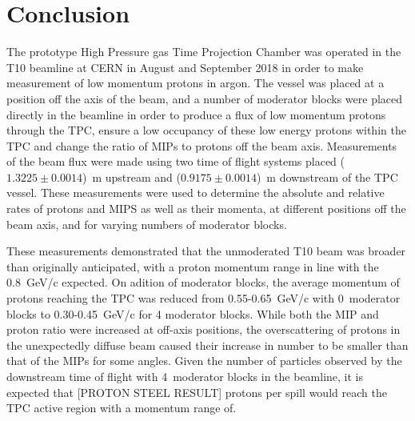 \section{Conclusion}
\label{hptpcPaper:sec:Conclusion}

The prototype High Pressure gas Time Projection Chamber was operated in the T10 beamline at CERN in August and September 2018 in order to make measurement of low momentum protons in argon.
The vessel was placed at a position off the axis of the beam, and a number of moderator blocks were placed directly in the beamline in order to produce a flux of low momentum protons through the TPC, ensure a low occupancy of these low energy protons within the TPC and change the ratio of MIPs to protons off the beam axis.
Measurements of the beam flux were made using two time of flight systems placed ($1.3225 \pm 0.0014$)~m upstream and ($0.9175 \pm 0.0014$)~m downstream of the TPC vessel.
These measurements were used to determine the absolute and relative rates of protons and MIPS as well as their momenta, at different positions off the beam axis, and for varying numbers of moderator blocks.

These measurements demonstrated that the unmoderated T10 beam was broader than originally anticipated, with a proton momentum range in line with the 0.8~GeV/c expected.
On adition of moderator blocks, the average momentum of protons reaching the TPC was reduced from 0.55-0.65~GeV/c with 0~moderator blocks to 0.30-0.45~GeV/c for 4 moderator blocks.
While both the MIP and proton ratio were increased at off-axis positions, the overscattering of protons in the unexpectedly diffuse beam caused their increase in number to be smaller than that of the MIPs for some angles.
Given the number of particles observed by the downstream time of flight with 4~moderator blocks in the beamline, it is expected that [PROTON STEEL RESULT] protons per spill would reach the TPC active region with a momentum range of.

